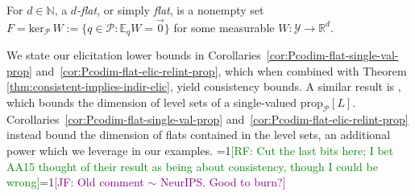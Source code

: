 \documentclass[anon,12pt]{colt2021} %
\newcommand{\Comments}{1}
\newcommand{\mynote}[2]{\ifnum\Comments=1\textcolor{#1}{#2}\fi}
\newcommand{\raf}[1]{\mynote{green}{[RF: #1]}}
\newcommand{\jessie}[1]{\mynote{purple}{[JF: #1]}}
\newcommand{\reals}{\mathbb{R}}
\newcommand{\prop}[2][\mathcal{P}]{\mathrm{prop}_{#1}[#2]}
\newcommand{\zeros}[1]{\mathrm{ker}_\P\,#1}
\newcommand{\E}{\mathbb{E}}
\renewcommand{\P}{\mathcal{P}}
\newcommand{\Y}{\mathcal{Y}}
\begin{document}
\begin{definition}[Flat]\label{def:flat-general}
  For $d\in\mathbb N$, a \emph{$d$-flat}, or simply \emph{flat}, is a nonempty set $F = \zeros{W} := \{q \in \P : \E_q W = \vec 0\}$ for some measurable $W:\Y \to \reals^d$.
\end{definition}

We state our elicitation lower bounds in Corollaries~\ref{cor:Pcodim-flat-single-val-prop} and~\ref{cor:Pcodim-flat-elic-relint-prop}, which when combined with Theorem \ref{thm:consistent-implies-indir-elic}, yield consistency bounds.
A similar result is \citet[Theorem 9]{agarwal2015consistent}, which bounds the dimension of level sets of a single-valued $\prop{L}$.
Corollaries~\ref{cor:Pcodim-flat-single-val-prop} and~\ref{cor:Pcodim-flat-elic-relint-prop} instead bound the dimension of flats contained in the level sets, an additional power which we leverage in our examples.
\raf{Cut the last bits here; I bet AA15 thought of their result as being about consistency, though I could be wrong}\jessie{Old comment $\sim$ NeurIPS.  Good to burn?} 
\end{document}
